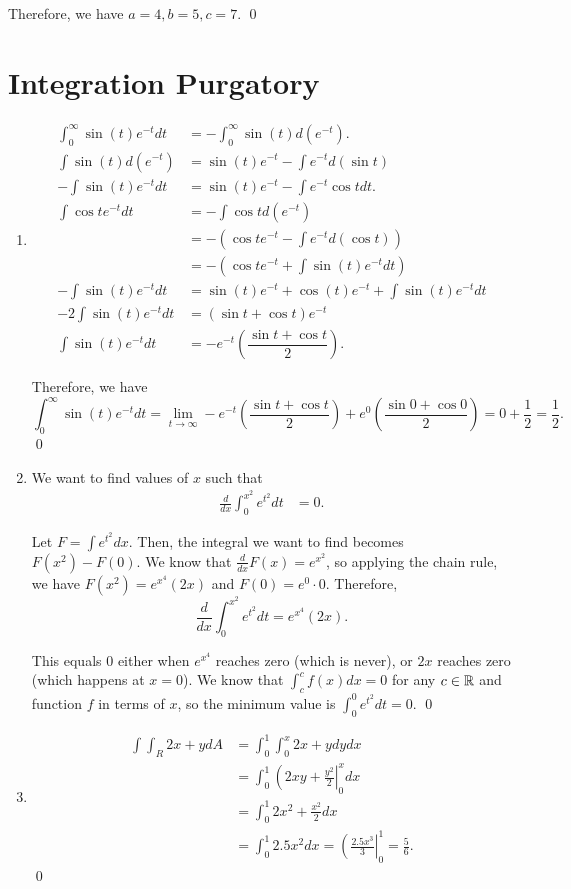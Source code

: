 \documentclass{article}
\begin{document}
Therefore, we have $a=4, b=5, c=7$. \qed

\section{Integration Purgatory}
\begin{enumerate}[label=\alph*.]
	\item 
	\begin{align*}
		\int_0^\infty \sin(t) e^{-t} dt &= -\int_0^\infty \sin(t) d(e^{-t}). \\
		\int \sin(t) d(e^{-t}) &= \sin(t) e^{-t} - \int e^{-t} d(\sin t) \\
		- \int \sin(t) e^{-t} dt &= \sin(t) e^{-t} - \int e^{-t} \cos t dt. \\
		\int \cos t e^{-t} dt &= -\int \cos t d(e^{-t}) \\
		&= -(\cos t e^{-t} - \int e^{-t} d(\cos t)) \\
		&= -(\cos t e^{-t} + \int \sin(t) e^{-t} dt) \\
		- \int \sin(t) e^{-t} dt &= \sin(t) e^{-t} + \cos(t) e^{-t} + \int \sin(t) e^{-t} dt \\
		-2 \int \sin(t) e^{-t} dt &= (\sin t + \cos t) e^{-t} \\
		\int \sin(t) e^{-t} dt &= - e^{-t} \left( \dfrac{\sin t + \cos t}{2} \right).
	\end{align*}

	Therefore, we have 
	\[\int_0^\infty \sin(t) e^{-t} dt = 
		\lim_{t \to \infty}-e^{-t}\left( \dfrac{\sin t + \cos t}{2} \right) + 
		e^{0}\left( \dfrac{\sin 0 + \cos 0}{2} \right) = 0 + \frac{1}{2} = \boxed{\frac{1}{2}}.\] \qed

	\item We want to find values of $x$ such that
	\begin{align*}
		\frac{d}{dx} \int_0^{x^2} e^{t^2} dt &= 0.
	\end{align*}

	Let $F = \int e^{t^2} dx$. Then, the integral we 
	want to find becomes $F(x^2) - F(0)$. We know that 
	$\frac{d}{dx} F(x) = e^{x^2}$, so applying the chain 
	rule, we have $F(x^2) = e^{x^4} (2x)$ and $F(0) = e^{0} \cdot 0$.
	Therefore, 
	\[\frac{d}{dx} \int_0^{x^2} e^{t^2} dt = e^{x^4}(2x).\]

	This equals $0$ either when $e^{x^4}$ reaches zero (which is never), or $2x$ reaches 
	zero (which happens at $x = 0$). We know that $\int_c^c f(x) dx = 0$ for any $c \in \mathbb R$
	and function $f$ in terms of $x$, so the minimum value is $\int_0^0 e^{t^2} dt = \boxed{0}$.
	\qed
	\item \begin{align*}{}
		\int \int_R 2x + y dA &= \int_0^1 \int_0^x 2x+y dy dx \\
		&= \int_0^1 \left(2xy + \frac{y^2}{2}\right|^x_0 dx \\ 
		&= \int_0^1 2x^2 + \frac{x^2}{2} dx \\ 
		&= \int_0^1 2.5x^2 dx = \left(\frac{2.5x^3}{3}\right|^1_0 = \boxed{\frac{5}{6}}.
	\end{align*}
	\qed
\end{enumerate}
\end{document}
